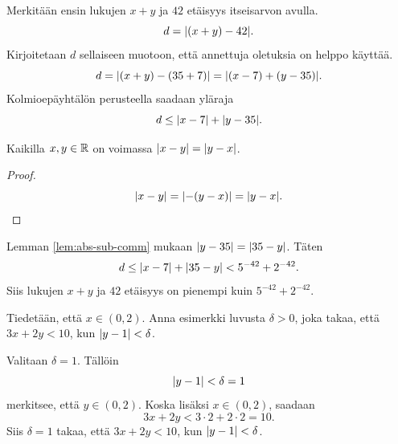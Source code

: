 \documentclass[12pt,a4paper]{article}
\begin{document}
\begin{solution}
Merkitään ensin lukujen \(x + y\) ja \(42\) etäisyys itseisarvon avulla.
\[d = \lvert(x + y) - 42\rvert.\]
Kirjoitetaan \(d\) sellaiseen muotoon, että annettuja oletuksia on helppo
käyttää.
\[d = \lvert(x + y) - (35 + 7)\rvert = \lvert(x - 7) + (y - 35)\rvert.\]
Kolmioepäyhtälön perusteella saadaan yläraja
\[d \leq \lvert x - 7\rvert + \lvert y - 35\rvert.\]

\begin{lemma}\label{lem:abs-sub-comm}
Kaikilla \(x,y \in \mathbb{R}\) on voimassa \(\lvert x - y\rvert = \lvert y - x\rvert\).
\end{lemma}
\begin{proof}
\[\lvert x - y\rvert = \lvert-(y - x)\rvert = \lvert y - x\rvert.\]
\end{proof}
Lemman \ref{lem:abs-sub-comm} mukaan \(\lvert y - 35\rvert = \lvert35 - y\rvert\).
Täten
\[d \leq \lvert x - 7\rvert + \lvert35 - y\rvert < 5^{-42} + 2^{-42}.\]
Siis lukujen \(x + y\) ja \(42\) etäisyys on pienempi kuin \(5^{-42}
+ 2^{-42}\).
\end{solution}

\begin{exercise}
Tiedetään, että \(x \in (0, 2)\). Anna esimerkki luvusta \(\delta > 0\), joka
takaa, että \(3x + 2y < 10\), kun \(\lvert y - 1\rvert < \delta\).
\end{exercise}

\begin{solution}
Valitaan \(\delta = 1\). Tällöin
\[\lvert y - 1\rvert < \delta = 1\]
merkitsee, että \(y \in (0, 2)\). Koska lisäksi \(x \in (0, 2)\), saadaan
\[3x + 2y < 3 \cdot 2 + 2 \cdot 2 = 10.\]
Siis \(\delta = 1\) takaa, että \(3x + 2y < 10\), kun \(\lvert y - 1\rvert < \delta\).
\end{solution}
\end{document}

